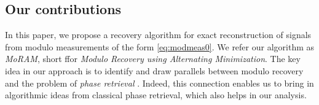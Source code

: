 
\subsection{Our contributions}
In this paper, we propose a recovery algorithm for exact reconstruction of signals from modulo measurements of the form \eqref{eq:modmeas0}. We refer our algorithm as \emph{MoRAM}, short ffor \emph{Modulo Recovery using Alternating Minimization}. The key idea in our approach is to identify and draw parallels between modulo recovery and the problem of \emph{phase retrieval} . Indeed, this connection enables us to bring in algorithmic ideas from classical phase retrieval, which also helps in our analysis. 

